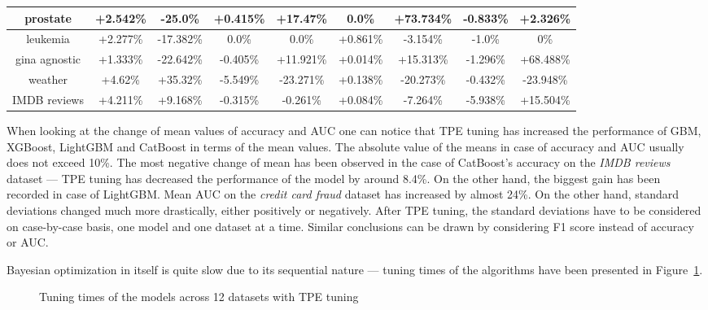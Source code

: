 \documentclass[magisterska, english]{pwr_wmat_praca_dyplomowa}
\theoremstyle{plain}
\numberwithin{theorem}{chapter}
\theoremstyle{definition}
\numberwithin{theorem}{chapter}
\newcommand{\gbm}{GBM, XGBoost, LightGBM and CatBoost }
\begin{document}
\begin{sidewaystable}
\begin{tabular}{c|cccccccc}
prostate & +2.542\% & -25.0\% & +0.415\% & +17.47\% & 0.0\% & +73.734\% & -0.833\% & +2.326\%\\ \hline
leukemia & +2.277\% & -17.382\% & 0.0\% & 0.0\% & +0.861\% & -3.154\% & -1.0\% & 0\%\\ \hline
gina agnostic & +1.333\% & -22.642\% & -0.405\% & +11.921\% & +0.014\% & +15.313\% & -1.296\% & +68.488\%\\ \hline
weather & +4.62\% & +35.32\% & -5.549\% & -23.271\% & +0.138\% & -20.273\% & -0.432\% & -23.948\%\\ \hline
IMDB reviews & +4.211\% & +9.168\% & -0.315\% & -0.261\% & +0.084\% & -7.264\% & -5.938\% & +15.504\%\\ \hline
\end{tabular}
\caption{Percentage gain/loss of values of means and standard deviations of AUC --- TPE tuning vs no tuning}
\label{tab:no_tuning_tpe_AUC_diff}
   \end{sidewaystable}
   
When looking at the change of mean values of accuracy and AUC one can notice that TPE tuning has increased the performance of \gbm in terms of the mean values. The absolute value of the means in case of accuracy and AUC usually does not exceed 10\%. The most negative change of mean has been observed in the case of CatBoost's accuracy on the \emph{IMDB reviews} dataset --- TPE tuning has decreased the performance of the model by around 8.4\%. On the other hand, the biggest gain has been recorded in case of LightGBM. Mean AUC on the \emph{credit card fraud} dataset has increased by almost 24\%. On the other hand, standard deviations changed much more drastically, either positively or negatively. After TPE tuning, the standard deviations have to be considered on case-by-case basis, one model and one dataset at a time. Similar conclusions can be drawn by considering F1 score instead of accuracy or AUC.

Bayesian optimization in itself is quite slow due to its sequential nature --- tuning times of the algorithms have been presented in Figure~\ref{fig:tpe_tuning_times}.

\begin{figure}[H]
	\centering
	\caption{Tuning times of the models across 12 datasets with TPE tuning}
	\label{fig:tpe_tuning_times}
\end{figure}
\end{document}

